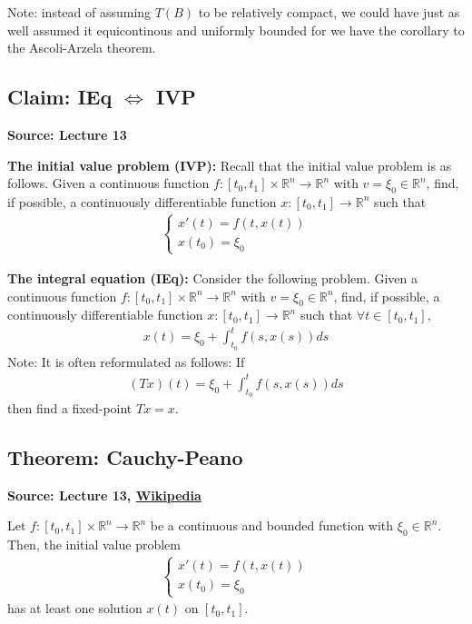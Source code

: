 \documentclass[11pt]{article}
\newcommand{\R}{\mathbb{R}}
\begin{document}
Note: instead of assuming $T(B)$ to be relatively compact, we could have just as well assumed it equicontinous and uniformly bounded for we have the corollary to the Ascoli-Arzela theorem.

\subsection{Claim: IEq $\Longleftrightarrow$ IVP}
\textbf{Source: Lecture 13}

\textbf{The initial value problem (IVP):}
Recall that the initial value problem is as follows. Given a continuous function $f: [t_0, t_1] \times \R^n \to \R^n$ with $v = \xi_0 \in\R^n$, find, if possible, a continuously differentiable function $x: [t_0, t_1] \to \R^n$ such that
\begin{align*}
    \begin{cases}
    x'(t) = f(t, x(t)) \\
    x(t_0) = \xi_0 
    \end{cases}
\end{align*}

\textbf{The integral equation (IEq):} Consider the following problem. Given a continuous function $f: [t_0, t_1] \times \R^n \to \R^n$ with $v = \xi_0 \in\R^n$, find, if possible, a continuously differentiable function $x: [t_0, t_1] \to \R^n$ such that $\forall t \in [t_0, t_1]$, 
\begin{align*}
    x(t) = \xi_0 + \int_{t_0}^t f(s, x(s)) ds
\end{align*}
Note: It is often reformulated as follows: If 
\begin{align*}
    (Tx)(t) = \xi_0 + \int_{t_0}^t f(s, x(s)) ds
\end{align*}
then find a fixed-point $Tx = x$. \medskip 

\subsection{Theorem: Cauchy-Peano}
\textbf{Source: Lecture 13, \href{https://en.wikipedia.org/wiki/Peano_existence_theorem\#:~:text=In\%20mathematics\%2C\%20specifically\%20in\%20the,to\%20certain\%20initial\%20value\%20problems.}{Wikipedia}}

Let $f: [t_0, t_1] \times \R^n \to \R^n$ be a continuous and bounded function with $\xi_0 \in\R^n$. Then, the initial value problem 
\begin{align*}
    \begin{cases}
    x'(t) = f(t, x(t)) \\
    x(t_0) = \xi_0 
    \end{cases}
\end{align*}
has at least one solution $x(t)$ on $[t_0, t_1]$.
\end{document}
